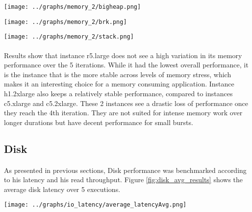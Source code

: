 \documentclass[11pt]{article}
\begin{document}
		\begin{center}
		\begin{minipage}{0.6\textwidth}
			 \label{fig:memory_bigheap_variation_results}
			\texttt{[image: ../graphs/memory\_2/bigheap.png]}
		\end{minipage}

		\begin{minipage}{0.6\textwidth}
			 \label{fig:memory_brk_variation_results}
			\texttt{[image: ../graphs/memory\_2/brk.png]}
		\end{minipage}

		\begin{minipage}{0.6\textwidth}
			 \label{fig:memory_stack_variation_results}
			\texttt{[image: ../graphs/memory\_2/stack.png]}
		\end{minipage}
		\end{center}

		\paragraph{} Results show that instance r5.large does not see a high
		variation in its memory performance over the 5 iterations. While it had
		the lowest overall performance, it is the instance that is the more
		stable across levels of memory stress, which makes it an interesting
		choice for a memory consuming application. Instance h1.2xlarge also keeps
		a relatively stable performance, compared to instances c5.xlarge and
		c5.2xlarge. These 2 instances see a drastic loss of performance once
		they reach the 4th iteration. They are not suited for intense memory
		work over longer durations but have decent performance for small bursts.

	\subsection{Disk}
		\paragraph{} As presented in previous sections, Disk performance was
		benchmarked according to his latency and his read throughput. Figure
		\ref{fig:disk_avg_results} shows the average disk latency over 5 executions.

		\begin{center}
		\begin{minipage}{0.6\textwidth}
			 \label{fig:disk_avg_results}
			\texttt{[image: ../graphs/io\_latency/average\_latencyAvg.png]}
		\end{minipage}
		\end{center}
\end{document}
